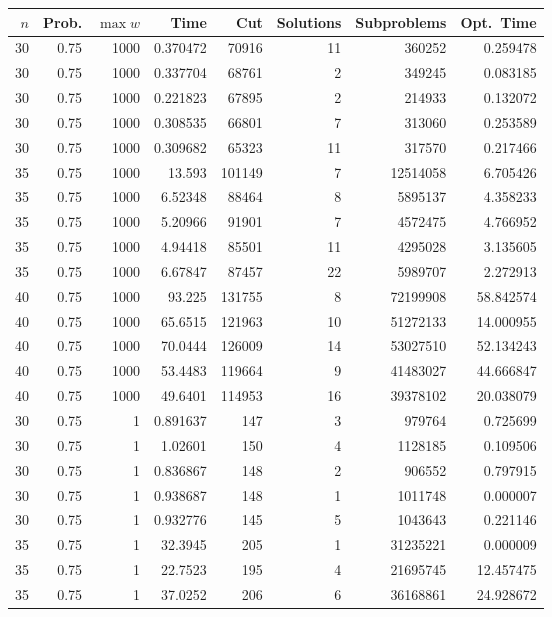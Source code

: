 \documentclass[a4paper,11pt]{article}
\begin{document}
\begin{table}
\begin{center}
\begin{tabular}{|rrr|r|r|rr|r|}
\hline
$n$ & Prob. & $\max w$ & Time & Cut & Solutions & Subproblems & Opt.\ Time \\
\hline
30 & 0.75 & 1000 & 0.370472 & 70916 & 11 & 360252 & 0.259478 \\
30 & 0.75 & 1000 & 0.337704 & 68761 & 2 & 349245 & 0.083185 \\
30 & 0.75 & 1000 & 0.221823 & 67895 & 2 & 214933 & 0.132072 \\
30 & 0.75 & 1000 & 0.308535 & 66801 & 7 & 313060 & 0.253589 \\
30 & 0.75 & 1000 & 0.309682 & 65323 & 11 & 317570 & 0.217466 \\
35 & 0.75 & 1000 & 13.593 & 101149 & 7 & 12514058 & 6.705426 \\
35 & 0.75 & 1000 & 6.52348 & 88464 & 8 & 5895137 & 4.358233 \\
35 & 0.75 & 1000 & 5.20966 & 91901 & 7 & 4572475 & 4.766952 \\
35 & 0.75 & 1000 & 4.94418 & 85501 & 11 & 4295028 & 3.135605 \\
35 & 0.75 & 1000 & 6.67847 & 87457 & 22 & 5989707 & 2.272913 \\
40 & 0.75 & 1000 & 93.225 & 131755 & 8 & 72199908 & 58.842574 \\
40 & 0.75 & 1000 & 65.6515 & 121963 & 10 & 51272133 & 14.000955 \\
40 & 0.75 & 1000 & 70.0444 & 126009 & 14 & 53027510 & 52.134243 \\
40 & 0.75 & 1000 & 53.4483 & 119664 & 9 & 41483027 & 44.666847 \\
40 & 0.75 & 1000 & 49.6401 & 114953 & 16 & 39378102 & 20.038079 \\
\hline
30 & 0.75 & 1 & 0.891637 & 147 & 3 & 979764 & 0.725699 \\
30 & 0.75 & 1 & 1.02601 & 150 & 4 & 1128185 & 0.109506 \\
30 & 0.75 & 1 & 0.836867 & 148 & 2 & 906552 & 0.797915 \\
30 & 0.75 & 1 & 0.938687 & 148 & 1 & 1011748 & 0.000007 \\
30 & 0.75 & 1 & 0.932776 & 145 & 5 & 1043643 & 0.221146 \\
35 & 0.75 & 1 & 32.3945 & 205 & 1 & 31235221 & 0.000009 \\
35 & 0.75 & 1 & 22.7523 & 195 & 4 & 21695745 & 12.457475 \\
35 & 0.75 & 1 & 37.0252 & 206 & 6 & 36168861 & 24.928672 \\

\end{tabular}
\end{center}
\end{table}
\end{document}

